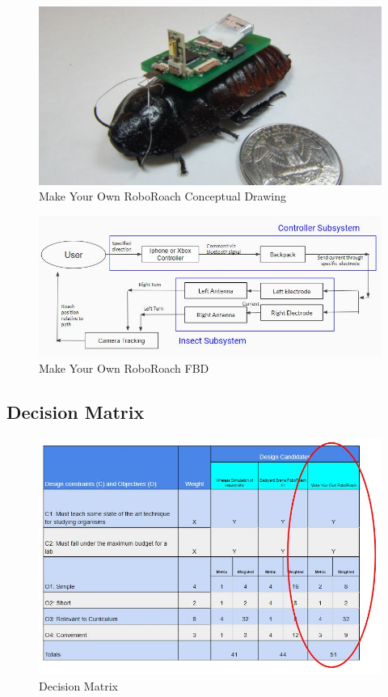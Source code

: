 \documentclass{article}
\begin{document}
\begin{figure}[ht!]
\centering
\includegraphics[scale=0.25]{myo.png}
\caption{Make Your Own RoboRoach Conceptual Drawing}
\label{fig:concept3}
\end{figure}

\begin{figure}[ht!]
\centering
\includegraphics[scale=0.45]{fbd3.JPG}
\caption{Make Your Own RoboRoach FBD}
\label{fig:FBD3}
\end{figure}

\subsection{Decision Matrix}

\begin{figure}[ht!]
\centering
\includegraphics[scale=0.5]{decisionmatrix.JPG}
\caption{Decision Matrix}
\label{fig:DecisionMatrix}
\end{figure}
\end{document}
